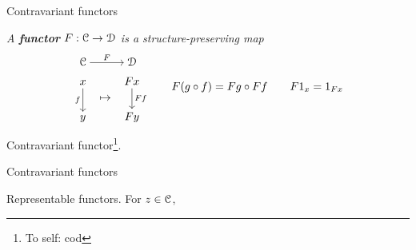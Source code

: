 \begin{frame}[t]{Contravariant functors} %

  \par{} \textit{A \textbf{functor} $F : \mathcal{C} \to \mathcal{D}$ is a structure-preserving map}
  \begin{align*}
    \begin{tikzcd}[
      ampersand replacement = \;,
      cramped,
      sep = tiny
    ]
      \C \arrow[rr, "F"] \;         \; \D   \\
      x \arrow[dd, "f"'] \;         \; F x \arrow[dd, "F f"]  \\
                         \; \mapsto \;      \\
      y                  \;         \; F y
    \end{tikzcd}
    \qquad F(g \circ f) = F g \circ F f
    \qquad F 1_x = 1_{F x}
  \end{align*}
  \par{} Contravariant functor\footnote{To self: cod}.
  
\end{frame}

\begin{frame}[t]{Contravariant functors} %

  \par{} Representable functors. For $z \in \mathcal{C}$,


\end{frame}

